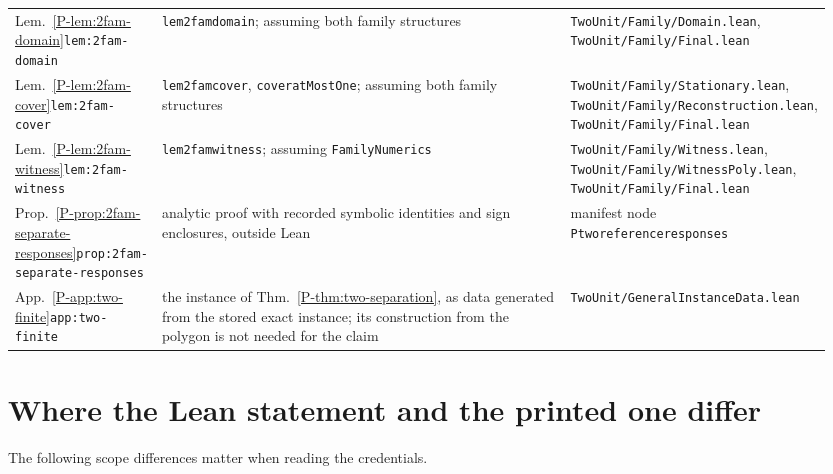 \documentclass[11pt]{article}
\newcommand{\pref}[1]{\ref*{P-#1}}
\newcommand{\lean}[1]{\begingroup\def\_{\textunderscore\allowbreak}\texttt{\small #1}\endgroup}
\begin{document}
\begin{landscape}
\begin{longtable}{@{}>{\raggedright\arraybackslash}p{0.14\linewidth}>{\raggedright\arraybackslash}p{0.50\linewidth}>{\raggedright\arraybackslash}p{0.31\linewidth}@{}}
Lem.~\pref{lem:2fam-domain}\newline\texttt{lem:2fam-domain} & \lean{lem\_2fam\_domain}; assuming both family structures & \lean{TwoUnit/Family/Domain.lean}, \lean{TwoUnit/Family/Final.lean} \\
Lem.~\pref{lem:2fam-cover}\newline\texttt{lem:2fam-cover} & \lean{lem\_2fam\_cover}, \lean{cover\_atMostOne}; assuming both family structures & \lean{TwoUnit/Family/Stationary.lean}, \lean{TwoUnit/Family/Reconstruction.lean}, \lean{TwoUnit/Family/Final.lean} \\
Lem.~\pref{lem:2fam-witness}\newline\texttt{lem:2fam-witness} & \lean{lem\_2fam\_witness}; assuming \lean{FamilyNumerics} & \lean{TwoUnit/Family/Witness.lean}, \lean{TwoUnit/Family/WitnessPoly.lean}, \lean{TwoUnit/Family/Final.lean} \\
Prop.~\pref{prop:2fam-separate-responses}\newline\texttt{prop:2fam-separate-\allowbreak responses} & analytic proof with recorded symbolic identities and sign enclosures, outside Lean & manifest node \lean{P\_two\_reference\_responses} \\
App.~\pref{app:two-finite}\newline\texttt{app:two-finite} & the instance of Thm.~\pref{thm:two-separation}, as data generated from the stored exact instance; its construction from the polygon is not needed for the claim & \lean{TwoUnit/GeneralInstanceData.lean} \\
\bottomrule
\end{longtable}
\end{landscape}

\section{Where the Lean statement and the printed one differ}
\label{s:gaps}

The following scope differences matter when reading the credentials.
\end{document}
